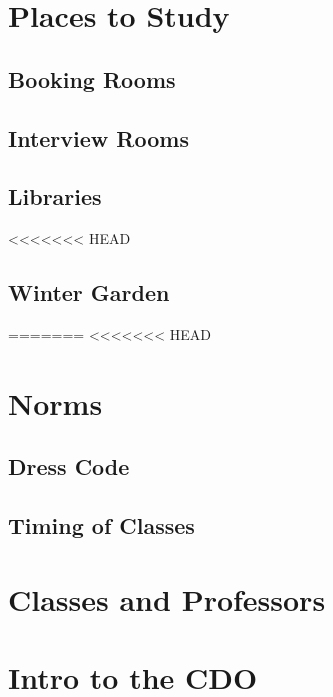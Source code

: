 \documentclass[
]{book}
\begin{document}
\hypertarget{places-to-study}{%
\chapter{Places to Study}\label{places-to-study}}

\hypertarget{booking-rooms}{%
\section{Booking Rooms}\label{booking-rooms}}

\hypertarget{interview-rooms}{%
\section{Interview Rooms}\label{interview-rooms}}

\hypertarget{libraries}{%
\section{Libraries}\label{libraries}}

<<<<<<< HEAD
\hypertarget{winter-garden}{%
\section{Winter Garden}\label{winter-garden}}
=======
<<<<<<< HEAD
\hypertarget{norms}{%
\chapter{Norms}\label{norms}}

\hypertarget{dress-code}{%
\section{Dress Code}\label{dress-code}}

\hypertarget{timing-of-classes}{%
\section{Timing of Classes}\label{timing-of-classes}}

\hypertarget{classes-and-professors}{%
\chapter{Classes and Professors}\label{classes-and-professors}}

\hypertarget{intro-to-the-cdo}{%
\chapter{Intro to the CDO}\label{intro-to-the-cdo}}
\end{document}
